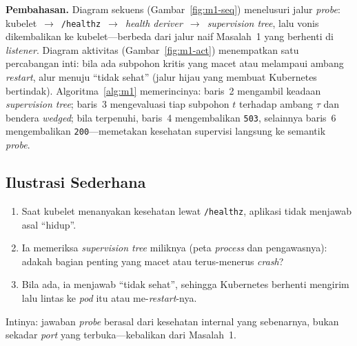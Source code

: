 \noindent\textbf{Pembahasan.} Diagram sekuens (Gambar~\ref{fig:m1-seq}) menelusuri jalur
\emph{probe}: kubelet~$\rightarrow$~\texttt{/healthz}~$\rightarrow$~\emph{health
deriver}~$\rightarrow$~\emph{supervision tree}, lalu vonis dikembalikan ke kubelet---berbeda
dari jalur naif Masalah~1 yang berhenti di \emph{listener}. Diagram aktivitas
(Gambar~\ref{fig:m1-act}) menempatkan satu percabangan inti: bila ada subpohon kritis yang
macet atau melampaui ambang \emph{restart}, alur menuju ``tidak sehat'' (jalur hijau yang
membuat Kubernetes bertindak). Algoritma~\ref{alg:m1} memerincinya: baris~2 mengambil
keadaan \emph{supervision tree}; baris~3 mengevaluasi tiap subpohon $t$ terhadap ambang
$\tau$ dan bendera \textit{wedged}; bila terpenuhi, baris~4 mengembalikan \texttt{503},
selainnya baris~6 mengembalikan \texttt{200}---memetakan kesehatan supervisi langsung ke
semantik \emph{probe}.

\subsection{Ilustrasi Sederhana}
\label{subsec:m1-ilustrasi}
\begin{enumerate}[nosep,leftmargin=2em]
  \item Saat kubelet menanyakan kesehatan lewat \texttt{/healthz}, aplikasi tidak menjawab
        asal ``hidup''.
  \item Ia memeriksa \emph{supervision tree} miliknya (peta \emph{process} dan pengawasnya):
        adakah bagian penting yang macet atau terus-menerus \emph{crash}?
  \item Bila ada, ia menjawab ``tidak sehat'', sehingga Kubernetes berhenti mengirim lalu
        lintas ke \emph{pod} itu atau me-\emph{restart}-nya.
\end{enumerate}
\noindent Intinya: jawaban \emph{probe} berasal dari kesehatan internal yang sebenarnya,
bukan sekadar \emph{port} yang terbuka---kebalikan dari Masalah~1.

